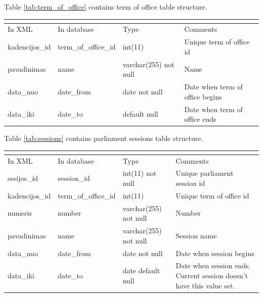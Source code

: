 \documentclass[a4paper,12pt]{article}
\begin{document}
	\noindent
	Table \ref{tab:term_of_office} contains term of office table structure.
	\begin{center}
		\begin{tabular}{L{3cm} L{3cm} L{2.2cm} L{3.8cm}}
			\\ 
			\hline
			In XML & In database & Type & Comments\\
			\hline 
			kadencijos\_id & term\_of\_office\_id & int(11) & Unique term of office id \\ 
			pavadinimas & name & varchar(255) not null & Name \\
			data\_nuo & date\_from & date not null & Date when term of office begins \\ 
			data\_iki & date\_to & default null & Date when term of office ends \\
			\hline
		\end{tabular}
		 \label{tab:term_of_office}
	\end{center}
	
	\hfill
	
	
	\noindent
	Table \ref{tab:sessions} contains parliament sessions table structure.
	\begin{center}
		\begin{tabular}{L{3cm} L{3cm} L{2.2cm} L{3.8cm}}
			\\ 
			\hline
			In XML & In database & Type & Comments\\
			\hline 
			sesijos\_id & session\_id & int(11) not null & Unique parliament session id \\
			kadencijos\_id & term\_of\_office\_id & int(11) & Unique term of office id \\ 
			numeris & number & varchar(255) not null & Number \\ 
			pavadinimas & name & varchar(255) not null & Session name \\ 
			data\_nuo & date\_from & date not null & Date when session begins \\
			data\_iki & date\_to & date default null & Date when session ends. Current session doesn't have this value set. \\
			\hline
		\end{tabular}
		 \label{tab:sessions}
	\end{center}
	
	\hfill
	
\end{document}

